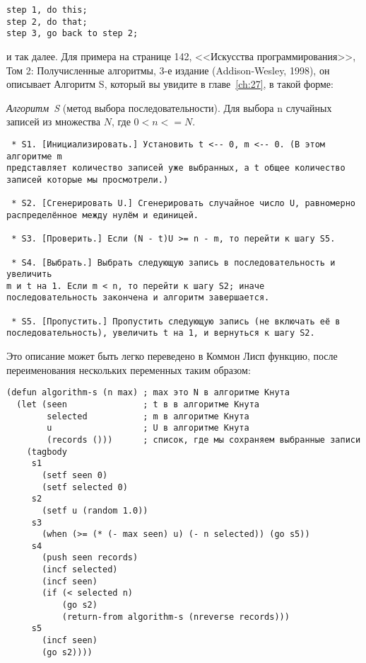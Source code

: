 \begin{verbatim}
step 1, do this; 
step 2, do that; 
step 3, go back to step 2;
\end{verbatim}

и так далее. Для примера на странице 142, <<Искусства программирования>>, Том 2:
Получисленные алгоритмы, 3-е издание (Addison-Wesley, 1998), он описывает Алгоритм S,
который вы увидите в главе~\ref{ch:27}, в такой форме:

\textit{Алгоритм~S} (метод выбора последовательности). Для выбора n случайных записей из
множества $N$, где $0 < n <= N$.

\begin{lstlisting}
 * S1. [Инициализировать.] Установить t <-- 0, m <-- 0. (В этом алгоритме m 
представляет количество записей уже выбранных, а t общее количество 
записей которые мы просмотрели.)

 * S2. [Сгенерировать U.] Сгенерировать случайное число U, равномерно 
распределённое между нулём и единицей.

 * S3. [Проверить.] Если (N - t)U >= n - m, то перейти к шагу S5.

 * S4. [Выбрать.] Выбрать следующую запись в последовательность и увеличить
m и t на 1. Если m < n, то перейти к шагу S2; иначе 
последовательность закончена и алгоритм завершается.

 * S5. [Пропустить.] Пропустить следующую запись (не включать её в 
последовательность), увеличить t на 1, и вернуться к шагу S2.
\end{lstlisting}

Это описание может быть легко переведено в Коммон Лисп функцию, после переименования
нескольких переменных таким образом:

\begin{lstlisting}
(defun algorithm-s (n max) ; max это N в алгоритме Кнута
  (let (seen               ; t в в алгоритме Кнута
        selected           ; m в алгоритме Кнута
        u                  ; U в алгоритме Кнута
        (records ()))      ; список, где мы сохраняем выбранные записи
    (tagbody
     s1
       (setf seen 0)
       (setf selected 0)
     s2
       (setf u (random 1.0))
     s3
       (when (>= (* (- max seen) u) (- n selected)) (go s5))
     s4
       (push seen records)
       (incf selected)
       (incf seen)
       (if (< selected n)
           (go s2)
           (return-from algorithm-s (nreverse records)))
     s5
       (incf seen)
       (go s2))))
\end{lstlisting}

